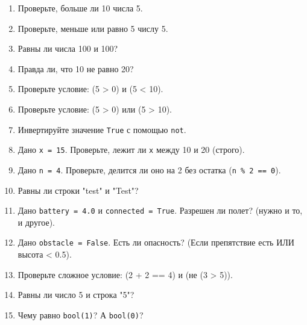 \begin{enumerate}
    \item Проверьте, больше ли 10 числа 5.
    \item Проверьте, меньше или равно 5 числу 5.
    \item Равны ли числа 100 и 100?
    \item Правда ли, что 10 не равно 20?
    \item Проверьте условие: (5 > 0) и (5 < 10).
    \item Проверьте условие: (5 > 0) или (5 > 10).
    \item Инвертируйте значение \texttt{True} с помощью \texttt{not}.
    \item Дано \texttt{x = 15}. Проверьте, лежит ли \texttt{x} между 10 и 20 (строго).
    \item Дано \texttt{n = 4}. Проверьте, делится ли оно на 2 без остатка (\texttt{n \% 2 == 0}).
    \item Равны ли строки "test" и "Test"?
    \item Дано \texttt{battery = 4.0} и \texttt{connected = True}. Разрешен ли полет? (нужно и то, и другое).
    \item Дано \texttt{obstacle = False}. Есть ли опасность? (Если препятствие есть ИЛИ высота < 0.5).
    \item Проверьте сложное условие: (2 + 2 == 4) и (не (3 > 5)).
    \item Равны ли число 5 и строка "5"?
    \item Чему равно \texttt{bool(1)}? А \texttt{bool(0)}?
\end{enumerate}
